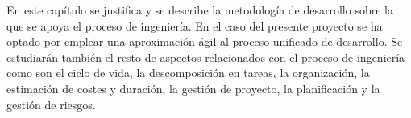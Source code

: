En este capítulo se justifica y se describe la metodología de desarrollo sobre la que se apoya el proceso de ingeniería. En el caso del presente proyecto se ha optado por emplear una aproximación ágil al proceso unificado de desarrollo. Se estudiarán también el resto de aspectos relacionados con el proceso de ingeniería como son el ciclo de vida, la descomposición en tareas, la organización, la estimación de costes y duración, la gestión de proyecto, la planificación y la gestión de riesgos.
